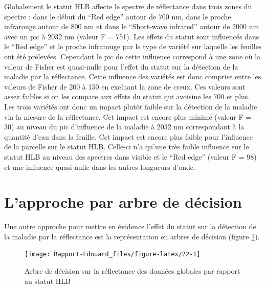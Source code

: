 \documentclass[
  11pt,
  french,
  a4paper,
  extrafontsizes,onecolumn,openright
  ]{memoir}
\begin{document}
\normalsize
\vfill
\newpage
Globalement le statut HLB affecte le spectre de réflectance dans trois zones du spectre : dans le début du ``Red edge'' autour de 700 nm, dans le proche infrarouge autour de 800 nm et dans le ``Short-wave infrared'' autour de 2000 nm avec un pic à 2032 nm (valeur F = 751). Les effets du statut sont influencés dans le ``Red edge'' et le proche infrarouge par le type de variété sur laquelle les feuilles ont été prélevées. Cependant le pic de cette influence correspond à une zone où la valeur de Fisher est quasi-nulle pour l'effet du statut sur la détection de la maladie par la réflectance. Cette influence des variétés est donc comprise entre les valeurs de Fisher de 200 à 150 en excluant la zone de creux. Ces valeurs sont assez faibles si on les compare aux effets du statut qui avoisine les 700 et plus. Les trois variétés ont donc un impact plutôt faible sur la détection de la maladie via la mesure de la réflectance. Cet impact est encore plus minime (valeur F = 30) au niveau du pic d'influence de la maladie à 2032 nm correspondant à la quantité d'eau dans la feuille. Cet impact est encore plus faible pour l'influence de la parcelle sur le statut HLB. Celle-ci n'a qu'une très faible influence sur le statut HLB au niveau des spectres dans visible et le ``Red edge'' (valeur F = 98) et une influence quasi-nulle dans les autres longueurs d'onde.

\vfill
\newpage

\hypertarget{lapproche-par-arbre-de-duxe9cision}{%
\section{L'approche par arbre de décision}\label{lapproche-par-arbre-de-duxe9cision}}

Une autre approche pour mettre en évidence l'effet du statut sur la détection de la maladie par la réflectance est la représentation en arbres de décision (figure \ref{fig:22}).

\scriptsize

\begin{figure}

{\centering \texttt{[image: Rapport-Edouard\_files/figure-latex/22-1]} 

}

\caption{Arbre de décision sur la réflectance des données globales par rapport au statut HLB}\label{fig:22}
\end{figure}

\normalsize
\end{document}
